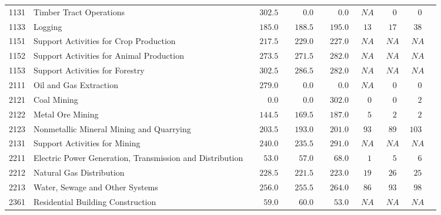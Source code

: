 \documentclass[9pt, oneside]{article}   	%
\begin{document}
\begin{longtable}{lp{3.5 in}ccccccc}
1131  & Timber Tract Operations & $\phantom{00}302.5$ & $\phantom{0000}0.0$ & $\phantom{0000}0.0$ & $\phantom{0}NA$ & $\phantom{00}0$ & $\phantom{00}0$ \\
1133  & Logging & $\phantom{00}185.0$ & $\phantom{00}188.5$ & $\phantom{00}195.0$ & $\phantom{0}13$ & $\phantom{0}17$ & $\phantom{0}38$ \\
1151  & Support Activities for Crop Production & $\phantom{00}217.5$ & $\phantom{00}229.0$ & $\phantom{00}227.0$ & $\phantom{0}NA$ & $\phantom{0}NA$ & $\phantom{0}NA$ \\
1152  & Support Activities for Animal Production & $\phantom{00}273.5$ & $\phantom{00}271.5$ & $\phantom{00}282.0$ & $\phantom{0}NA$ & $\phantom{0}NA$ & $\phantom{0}NA$ \\
1153  & Support Activities for Forestry & $\phantom{00}302.5$ & $\phantom{00}286.5$ & $\phantom{00}282.0$ & $\phantom{0}NA$ & $\phantom{0}NA$ & $\phantom{0}NA$ \\
2111  & Oil and Gas Extraction & $\phantom{00}279.0$ & $\phantom{0000}0.0$ & $\phantom{0000}0.0$ & $\phantom{0}NA$ & $\phantom{00}0$ & $\phantom{00}0$ \\
2121  & Coal Mining & $\phantom{0000}0.0$ & $\phantom{0000}0.0$ & $\phantom{00}302.0$ & $\phantom{00}0$ & $\phantom{00}0$ & $\phantom{00}2$ \\
2122  & Metal Ore Mining & $\phantom{00}144.5$ & $\phantom{00}169.5$ & $\phantom{00}187.0$ & $\phantom{00}5$ & $\phantom{00}2$ & $\phantom{00}2$ \\
2123  & Nonmetallic Mineral Mining and Quarrying & $\phantom{00}203.5$ & $\phantom{00}193.0$ & $\phantom{00}201.0$ & $\phantom{0}93$ & $\phantom{0}89$ & $103$ \\
2131  & Support Activities for Mining & $\phantom{00}240.0$ & $\phantom{00}235.5$ & $\phantom{00}291.0$ & $\phantom{0}NA$ & $\phantom{0}NA$ & $\phantom{0}NA$ \\
2211  & Electric Power Generation, Transmission and Distribution & $\phantom{000}53.0$ & $\phantom{000}57.0$ & $\phantom{000}68.0$ & $\phantom{00}1$ & $\phantom{00}5$ & $\phantom{00}6$ \\
2212  & Natural Gas Distribution & $\phantom{00}228.5$ & $\phantom{00}221.5$ & $\phantom{00}223.0$ & $\phantom{0}19$ & $\phantom{0}26$ & $\phantom{0}25$ \\
2213  & Water, Sewage and Other Systems & $\phantom{00}256.0$ & $\phantom{00}255.5$ & $\phantom{00}264.0$ & $\phantom{0}86$ & $\phantom{0}93$ & $\phantom{0}98$ \\
2361  & Residential Building Construction & $\phantom{000}59.0$ & $\phantom{000}60.0$ & $\phantom{000}53.0$ & $\phantom{0}NA$ & $\phantom{0}NA$ & $\phantom{0}NA$ \\

\end{longtable}
\end{document}
